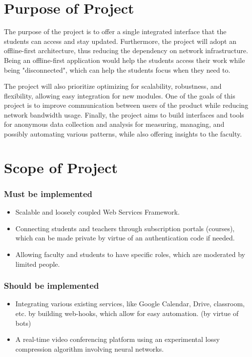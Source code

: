 \section{Purpose of Project}

The purpose of the project is to offer a single integrated interface that the students can access and stay updated.
Furthermore, the project will adopt an offline-first architecture, thus reducing the dependency on network infrastructure.
Being an offline-first application would help the students access their work while being "disconnected", which 
can help the students focus when they need to.

The project will also prioritize optimizing for scalability, robustness, and flexibility, allowing easy integration for new modules. One of the goals of this project is to improve communication between users of the product while reducing 
network bandwidth usage.
Finally, the project aims to build interfaces and tools for anonymous data collection and analysis for measuring,
managing, and possibly automating various patterns, while also offering insights to the faculty.

\section{Scope of Project}
\subsubsection{Must be implemented}
\begin{itemize}
    \item Scalable and loosely coupled Web Services Framework.
    \item Connecting students and teachers through subscription portals (courses), 
    which can be made private by virtue of an authentication code if needed.
    \item Allowing faculty and students to have specific roles, which are moderated by limited people.
\end{itemize}

\subsubsection{Should be implemented}
\begin{itemize}
    \item Integrating various existing services, like Google Calendar, Drive, classroom, etc. 
    by building web-hooks, which allow for easy automation. (by virtue of bots)
    \item A real-time video conferencing platform using an experimental lossy compression algorithm involving neural networks.
\end{itemize}

